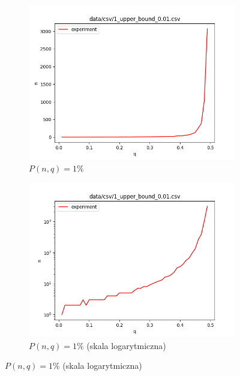 \documentclass[a4paper,11pt]{article}
\theoremstyle{mytheor}
\begin{document}
\begin{figure}[H]
    \begin{subfigure}{0.5\textwidth}
        \includegraphics[width=1.0\linewidth]{1_upper_bound_0.01.png}
        \caption{$P(n, q) = 1\%$}
        \label{fig:subim1}
    \end{subfigure}
    \begin{subfigure}{0.5\textwidth}
        \includegraphics[width=1.0\linewidth]{1_upper_bound_log_0.01.png}
        \caption{$P(n, q) = 1\%$ (skala logarytmiczna)}
        \label{fig:subim1}
    \end{subfigure}


\end{figure}
\end{document}
